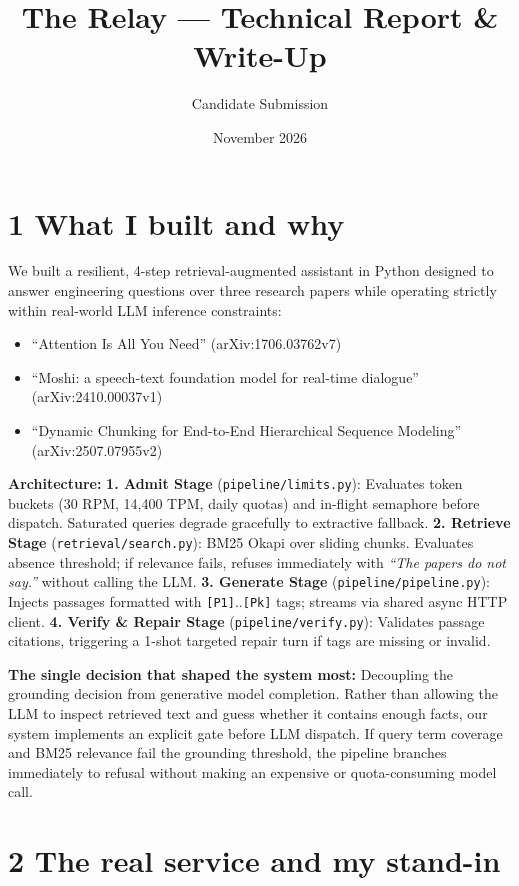 \documentclass[10pt,a4paper]{article}
\title{\textbf{The Relay --- Technical Report \& Write-Up}}
\author{Candidate Submission}
\date{November 2026}
\begin{document}
\maketitle

\section*{1 What I built and why}
We built a resilient, 4-step retrieval-augmented assistant in Python designed to answer engineering questions over three research papers while operating strictly within real-world LLM inference constraints:
\begin{itemize}
    \setlength\itemsep{0em}
    \item ``Attention Is All You Need'' (arXiv:1706.03762v7)
    \item ``Moshi: a speech-text foundation model for real-time dialogue'' (arXiv:2410.00037v1)
    \item ``Dynamic Chunking for End-to-End Hierarchical Sequence Modeling'' (arXiv:2507.07955v2)
\end{itemize}

\textbf{Architecture:}
\textbf{1. Admit Stage} (\texttt{pipeline/limits.py}): Evaluates token buckets (30 RPM, 14,400 TPM, daily quotas) and in-flight semaphore before dispatch. Saturated queries degrade gracefully to extractive fallback.
\textbf{2. Retrieve Stage} (\texttt{retrieval/search.py}): BM25 Okapi over sliding chunks. Evaluates absence threshold; if relevance fails, refuses immediately with \textit{``The papers do not say.''} without calling the LLM.
\textbf{3. Generate Stage} (\texttt{pipeline/pipeline.py}): Injects passages formatted with \texttt{[P1]}..\texttt{[Pk]} tags; streams via shared async HTTP client.
\textbf{4. Verify \& Repair Stage} (\texttt{pipeline/verify.py}): Validates passage citations, triggering a 1-shot targeted repair turn if tags are missing or invalid.

\textbf{The single decision that shaped the system most:} Decoupling the grounding decision from generative model completion. Rather than allowing the LLM to inspect retrieved text and guess whether it contains enough facts, our system implements an explicit gate before LLM dispatch. If query term coverage and BM25 relevance fail the grounding threshold, the pipeline branches immediately to refusal without making an expensive or quota-consuming model call.

\section*{2 The real service and my stand-in}
\end{document}
